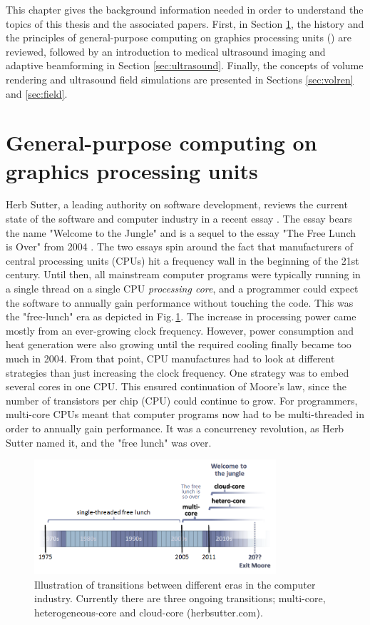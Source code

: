 %

This chapter gives the background information needed in order to understand the topics of this thesis and the associated papers. First, in Section \ref{sec:gpgpu}, the history and the principles of general-purpose computing on graphics processing units () are reviewed, followed by an introduction to medical ultrasound imaging and adaptive beamforming in Section \ref{sec:ultrasound}. Finally, the concepts of volume rendering and ultrasound field simulations are presented in Sections \ref{sec:volren} and \ref{sec:field}.

\section{General-purpose computing on graphics processing units}\label{sec:gpgpu}
Herb Sutter, a leading authority on software development, reviews the current state of the software and computer industry in a recent essay \cite{HerbSutter}. The essay bears the name "Welcome to the Jungle" and is a sequel to the essay "The Free Lunch is Over" from 2004 \cite{HerbSuttera}. The two essays spin around the fact that manufacturers of central processing units (CPUs) hit a frequency wall in the beginning of the 21st century. Until then, all mainstream computer programs were typically running in a single thread on a single CPU \textit{processing core}, and a programmer could expect the software to annually gain performance without touching the code. This was the "free-lunch" era as depicted in Fig.\,\ref{fig:jungle}. The increase in processing power came mostly from an ever-growing clock frequency. However, power consumption and heat generation were also growing until the required cooling finally became too much in 2004.  From that point, CPU manufactures had to look at different strategies than just increasing the clock frequency. One strategy was to embed several cores in one CPU. This ensured continuation of Moore's law, since the number of transistors per chip (CPU) could continue to grow. For programmers, multi-core CPUs meant that computer programs now had to be multi-threaded in order to annually gain performance. It was a concurrency revolution, as Herb Sutter named it, and  the "free lunch" was over.

\begin{figure}
\centering
\includegraphics[width=0.8\textwidth]{img/free_lunsh.png}
\caption{Illustration of transitions between different eras in the computer industry. Currently there are three ongoing transitions; multi-core, heterogeneous-core and cloud-core (herbsutter.com).}
\label{fig:jungle}
\end{figure}

